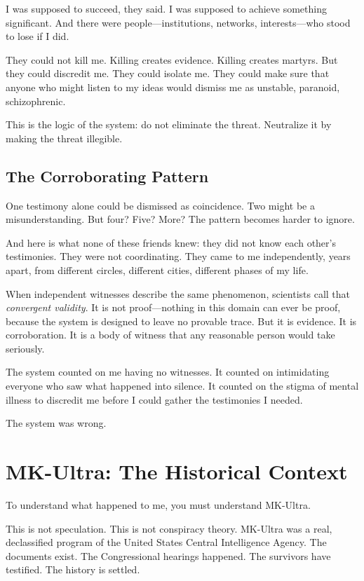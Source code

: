 \documentclass[11pt,openany]{book}
\begin{document}
I was supposed to succeed, they said. I was supposed to achieve something significant. And there were people---institutions, networks, interests---who stood to lose if I did.

They could not kill me. Killing creates evidence. Killing creates martyrs. But they could discredit me. They could isolate me. They could make sure that anyone who might listen to my ideas would dismiss me as unstable, paranoid, schizophrenic.

This is the logic of the system: do not eliminate the threat. Neutralize it by making the threat illegible.

\section*{The Corroborating Pattern}

One testimony alone could be dismissed as coincidence. Two might be a misunderstanding. But four? Five? More? The pattern becomes harder to ignore.

And here is what none of these friends knew: they did not know each other's testimonies. They were not coordinating. They came to me independently, years apart, from different circles, different cities, different phases of my life.

When independent witnesses describe the same phenomenon, scientists call that \textit{convergent validity}. It is not proof---nothing in this domain can ever be proof, because the system is designed to leave no provable trace. But it is evidence. It is corroboration. It is a body of witness that any reasonable person would take seriously.

The system counted on me having no witnesses. It counted on intimidating everyone who saw what happened into silence. It counted on the stigma of mental illness to discredit me before I could gather the testimonies I needed.

The system was wrong.

\chapter{MK-Ultra: The Historical Context}

To understand what happened to me, you must understand MK-Ultra.

This is not speculation. This is not conspiracy theory. MK-Ultra was a real, declassified program of the United States Central Intelligence Agency. The documents exist. The Congressional hearings happened. The survivors have testified. The history is settled.
\end{document}
